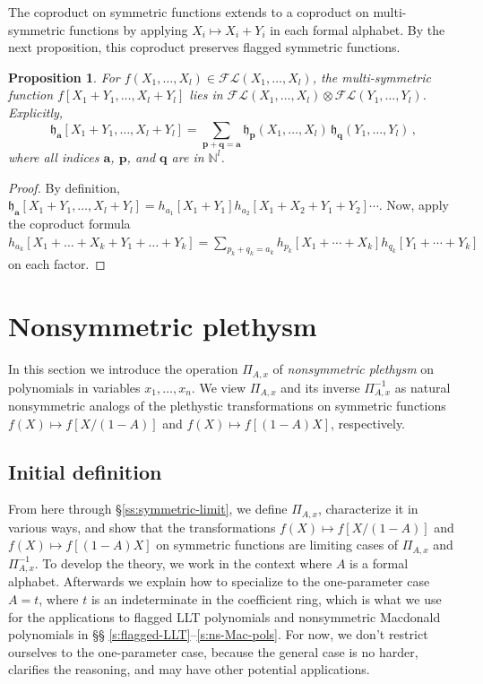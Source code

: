 \documentclass[12pt]{amsart}
\newtheorem{prop}[thm]{Proposition}
\theoremstyle{definition}
\theoremstyle{remark}
\newcommand{\NN}{{\mathbb N}}
\newcommand{\aA}{{\mathbf a}}
\newcommand{\pp}{{\mathbf p}}
\newcommand{\qq}{{\mathbf q}}
\newcommand{\fh}{{\mathfrak h}}
\newcommand{\FLambda}{\mathcal{F\!L}}
\begin{document}
The coproduct on symmetric functions extends to a coproduct on
multi-symmetric functions by applying \(X_i \mapsto X_i+Y_i\) in each
formal alphabet.  By the next proposition, this coproduct preserves
flagged symmetric functions.

\begin{prop}
\label{p coprod formula} For \(f(X_1,\ldots,X_l) \in
\FLambda(X_1,\ldots,X_l)\), the multi-symmetric function \(
f[X_1+Y_1,\ldots,X_l+Y_l]\) lies in \(\FLambda(X_1,\ldots,X_l) \otimes
\FLambda(Y_1,\ldots,Y_l)\). Explicitly,
\begin{equation}
\label{e coprod formula} \fh_{\aA}[X_1+Y_1,\ldots,X_l+Y_l] = \sum_{\pp
+ \qq = \aA} \fh_{\pp}(X_1,\ldots,X_l)\,  \fh_{\qq}(Y_1,\ldots,Y_l) \,,
\end{equation}
where all indices $\aA $, $\pp $, and $\qq $ are in $\NN ^{l}$.
\end{prop}

\begin{proof}
By definition, \(\fh_{\aA}[X_1+Y_1,\ldots,X_l+Y_l] =
h_{a_1}[X_1+Y_1]h_{a_2}[X_1+X_2+Y_1+Y_2] \cdots \). Now, apply the
coproduct formula $h_{a_k}[X_1+\dots +X_k+Y_1 + \dots + Y_k] =
\sum_{p_k+q_k = a_k} h_{p_k}[X_1+\cdots+X_k] h_{q_k}[Y_1+\cdots+Y_k]$
on each factor.
\end{proof}


\section{Nonsymmetric plethysm}
\label{s:ns-plethysm}

In this section we introduce the operation $\Pi _{A,x}$ of {\em
nonsymmetric plethysm} on polynomials in variables
$x_{1},\ldots,x_{n}$.  We view $\Pi _{A,x}$ and its inverse $\Pi_{A,x}^{-1}$ as natural nonsymmetric analogs of the plethystic
transformations on symmetric functions $f(X)\mapsto {f[X/(1-A)]}$ and
$f(X)\mapsto f[(1-A) X]$, respectively.


\subsection{Initial definition}
\label{ss:ns-pleth-def}

From here through \S \ref{ss:symmetric-limit}, we define $\Pi _{A,x}$,
characterize it in various ways, and show that the transformations
$f(X)\mapsto {f[X/(1-A)]}$ and $f(X)\mapsto f[(1-A) X]$ on symmetric
functions are limiting cases of $\Pi _{A,x}$ and $\Pi _{A,x}^{-1}$.
To develop the theory, we work in the context where $A$ is a formal
alphabet.  Afterwards we explain how to specialize to the
one-parameter case $A=t$, where $t$ is an indeterminate in the
coefficient ring, which is what we use for the applications to flagged
LLT polynomials and nonsymmetric Macdonald polynomials in \S \S
\ref{s:flagged-LLT}--\ref{s:ns-Mac-pols}.  For now, we don't restrict
ourselves to the one-parameter case, because the general case is no
harder, clarifies the reasoning, and may have other potential
applications.
\end{document}
